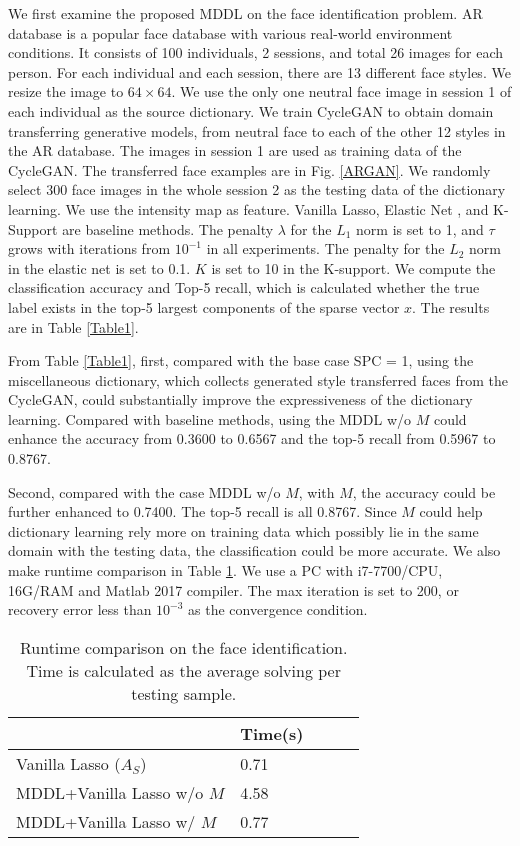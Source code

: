 \documentclass{article}
\begin{document}
We first examine the proposed MDDL on the face identification problem. AR database \cite{mart2001pami} is a popular face database with various real-world environment conditions. It consists of 100 individuals, 2 sessions, and total 26 images for each person. For each individual and each session, there are 13 different face styles. We resize the image to $64\times 64$. We use the only one neutral face image in session 1 of each individual as the source dictionary. We train CycleGAN \cite{zhu2017unpaired} to obtain domain transferring generative models, from neutral face to each of the other 12 styles in the AR database. The images in session 1 are used as training data of the CycleGAN. The transferred face examples are in Fig. \ref{ARGAN}. We randomly select 300 face images in the whole session 2 as the testing data of the dictionary learning. We use the intensity map as feature. Vanilla Lasso, Elastic Net \cite{zou2005regularization}, and K-Support \cite{lai2014efficient} are baseline methods. The penalty $\lambda$ for the $L_1$ norm is set to 1, and $\tau$ grows with iterations from $10^{-1}$ in all experiments. The penalty for the $L_2$ norm in the elastic net is set to 0.1. $K$ is set to 10 in the K-support. We compute the classification accuracy and Top-5 recall, which is calculated whether the true label exists in the top-5 largest components of the sparse vector $x$. The results are in Table \ref{Table1}.

From Table \ref{Table1}, first, compared with the base case SPC = 1, using the miscellaneous dictionary, which collects generated style transferred faces from the CycleGAN, could substantially improve the expressiveness of the dictionary learning. Compared with baseline methods, using the MDDL w/o $M$ could enhance the accuracy from 0.3600 to 0.6567 and the top-5 recall from 0.5967 to 0.8767. 

Second, compared with the case MDDL w/o $M$, with $M$, the accuracy could be further enhanced to 0.7400. The top-5 recall is all 0.8767. Since $M$ could help dictionary learning rely more on training data which possibly lie in the same domain with the testing data, the classification could be more accurate. We also make runtime comparison in Table \ref{Table2}. We use a PC with i7-7700/CPU, 16G/RAM and Matlab 2017 compiler. The max iteration is set to 200, or recovery error less than $10^{-3}$ as the convergence condition.

\begin{table}[!tb]
\caption{Runtime comparison on the face identification. Time is calculated as the average solving per testing sample.}
\label{Table2}
\begin{center}
\begin{tabular}{|l|l|l|l|l|}
\hline
                            & Time(s) \\ \hline
Vanilla Lasso ($A_S$)       & 0.71     \\ \hline
MDDL+Vanilla Lasso w/o $M$  & 4.58    \\ \hline
MDDL+Vanilla Lasso w/ $M$   & 0.77             \\ \hline
\end{tabular}
\end{center}
\end{table}
\end{document}
